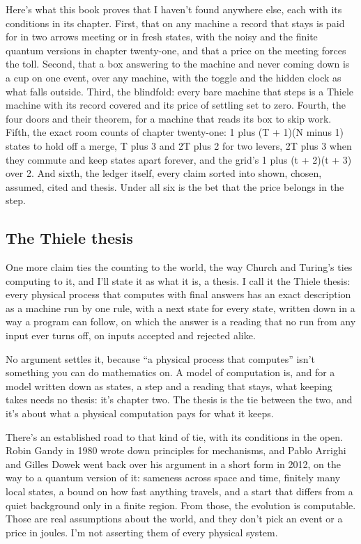 \documentclass[11pt,twoside]{article}
\theoremstyle{thielethm}
\theoremstyle{thieledef}
\theoremstyle{thieledef}
\theoremstyle{thieledef}
\theoremstyle{thielethm}
\theoremstyle{thieleobs}
\theoremstyle{thielethm}
\begin{document}
Here's what this book proves that I haven't found anywhere else, each with its conditions in its chapter. First, that on any machine a record that stays is paid for in two arrows meeting or in fresh states, with the noisy and the finite quantum versions in chapter twenty-one, and that a price on the meeting forces the toll. Second, that a box answering to the machine and never coming down is a cup on one event, over any machine, with the toggle and the hidden clock as what falls outside. Third, the blindfold: every bare machine that steps is a Thiele machine with its record covered and its price of settling set to zero. Fourth, the four doors and their theorem, for a machine that reads its box to skip work. Fifth, the exact room counts of chapter twenty-one: 1 plus (T + 1)(N minus 1) states to hold off a merge, T plus 3 and 2T plus 2 for two levers, 2T plus 3 when they commute and keep states apart forever, and the grid's 1 plus (t + 2)(t + 3) over 2. And sixth, the ledger itself, every claim sorted into shown, chosen, assumed, cited and thesis. Under all six is the bet that the price belongs in the step.

\subsection{The Thiele thesis}

One more claim ties the counting to the world, the way Church and Turing's ties computing to it, and I'll state it as what it is, a thesis. I call it the Thiele thesis: every physical process that computes with final answers has an exact description as a machine run by one rule, with a next state for every state, written down in a way a program can follow, on which the answer is a reading that no run from any input ever turns off, on inputs accepted and rejected alike.

No argument settles it, because ``a physical process that computes'' isn't something you can do mathematics on. A model of computation is, and for a model written down as states, a step and a reading that stays, what keeping takes needs no thesis: it's chapter two. The thesis is the tie between the two, and it's about what a physical computation pays for what it keeps.

There's an established road to that kind of tie, with its conditions in the open. Robin Gandy in 1980 wrote down principles for mechanisms, and Pablo Arrighi and Gilles Dowek went back over his argument in a short form in 2012, on the way to a quantum version of it: sameness across space and time, finitely many local states, a bound on how fast anything travels, and a start that differs from a quiet background only in a finite region. From those, the evolution is computable. Those are real assumptions about the world, and they don't pick an event or a price in joules. I'm not asserting them of every physical system.
\end{document}
